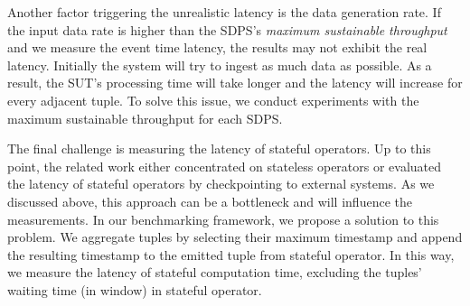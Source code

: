 Another factor triggering the unrealistic latency is the data generation rate. If the input data rate is higher than the SDPS's \textit{maximum sustainable throughput} and we measure the event time latency, the results may not exhibit the real  latency. 
Initially the system will try to ingest as much data as possible. As a result, the SUT's processing time will take longer and the latency will increase for every adjacent tuple. To solve this issue, we conduct experiments with the maximum sustainable throughput for each SDPS. 


 The final challenge is measuring the latency of stateful operators. Up to this point, the related work either concentrated on stateless operators or evaluated the latency of stateful operators by checkpointing to external systems. As we discussed above, this approach can be a bottleneck and will influence the measurements. In our benchmarking framework, we propose a solution to this problem.  
We aggregate tuples by selecting their maximum timestamp and append the resulting timestamp to the emitted tuple from stateful operator. 
 In this way, we measure the latency of stateful computation time, excluding the tuples' waiting time (in window) in stateful operator. 





